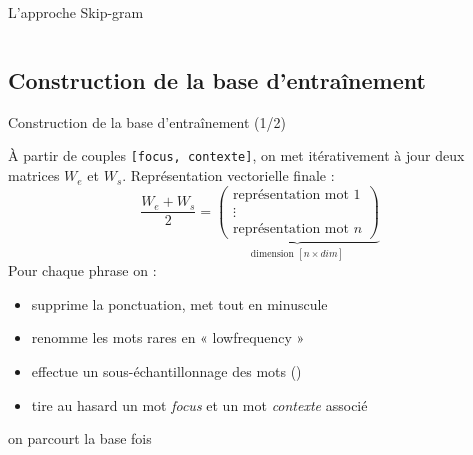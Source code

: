 \documentclass[10pt,xcolor=table,color={dvipsnames,usenames},ignorenonframetext,usepdftitle=false,french]{beamer}
\begin{document}
\begin{frame}{L'approche Skip-gram}
\begin{columns}
\begin{column}{0.4\textwidth}
\end{column}
\end{columns}

\end{frame}

\hypertarget{construction-de-la-base-dentrauxeenement}{%
\subsection{Construction de la base
d'entraînement}\label{construction-de-la-base-dentrauxeenement}}

\begin{frame}[fragile]{Construction de la base d'entraînement (1/2)}
\protect\hypertarget{construction-de-la-base-dentrauxeenement-12}{}

\bcoutil À partir de couples \texttt{{[}focus,\ contexte{]}}, on met
itérativement à jour deux matrices \(W_e\) et \(W_s\). Représentation
vectorielle finale : \[
\frac{W_e+W_s}{2}=\underbrace{
\begin{pmatrix}
\text{représentation mot 1} \\ \vdots
\\
\text{représentation mot }n 
\end{pmatrix}}_{\text{dimension }[n\times dim]}
\] \pause Pour chaque phrase on :

\begin{itemize}
\item
  supprime la ponctuation, met tout en minuscule
\item
  renomme les mots rares en « lowfrequency »
\item
  effectue un sous-échantillonnage des mots ()
\item
  tire au hasard un mot \emph{focus} et un mot \emph{contexte} associé
\end{itemize}

\faArrowCircleRight{} on parcourt la base  fois

\end{frame}
\end{document}

